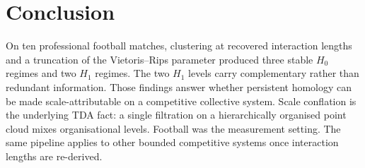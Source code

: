 \section{Conclusion}

On ten professional football matches, clustering at recovered
interaction lengths and a truncation of the Vietoris--Rips parameter
produced three stable $H_0$ regimes and two $H_1$ regimes. The two
$H_1$ levels carry complementary rather than redundant information.
Those findings answer whether persistent homology can be made
scale-attributable on a competitive collective system. Scale
conflation is the underlying TDA fact: a single filtration on a
hierarchically organised point cloud mixes organisational levels.
Football was the measurement setting. The same pipeline applies to
other bounded competitive systems once interaction lengths are
re-derived.
